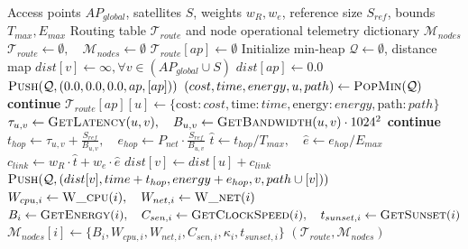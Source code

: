 \begin{algorithm}[hbtp]
\caption{Multi-Source Constellation Topology and Telemetry Mapping}
\label{alg:constellation_mapping}
\small
\begin{algorithmic}[1]
\Require Access points $AP_{global}$, satellites $S$, weights $w_R, w_e$, reference size $S_{ref}$, bounds $T_{max}, E_{max}$
\Ensure Routing table $\mathcal{T}_{route}$ and node operational telemetry dictionary $\mathcal{M}_{nodes}$
\State $\mathcal{T}_{route} \gets \emptyset, \quad \mathcal{M}_{nodes} \gets \emptyset$
    \State $\mathcal{T}_{route}[ap] \gets \emptyset$
    \State Initialize min-heap $\mathcal{Q} \gets \emptyset$, distance map $dist[v] \gets \infty, \forall v \in (AP_{global} \cup S)$
    \State $dist[ap] \gets 0.0$
    \State $\Call{Push}{\mathcal{Q}, (0.0, 0.0, 0.0, ap, [ap])}$ 
        \State $(cost, time, energy, u, path) \gets \Call{PopMin}{\mathcal{Q}}$
            \State \textbf{continue}
        \EndIf
            \State $\mathcal{T}_{route}[ap][u] \gets \{ \text{cost}: cost, \text{time}: time, \text{energy}: energy, \text{path}: path \}$
        \EndIf
            \State $\tau_{u,v} \gets \Call{GetLatency}{u, v}, \quad B_{u,v} \gets \Call{GetBandwidth}{u, v} \cdot 1024^2$
             
                \State \textbf{continue}
            \EndIf
            \State $t_{hop} \gets \tau_{u,v} + \frac{S_{ref}}{B_{u,v}}, \quad e_{hop} \gets P_{net} \cdot \frac{S_{ref}}{B_{u,v}}$
            \State $\hat{t} \gets t_{hop} / T_{max}, \quad \hat{e} \gets e_{hop} / E_{max}$
            \State $c_{link} \gets w_R \cdot \hat{t} + w_e \cdot \hat{e}$
                \State $dist[v] \gets dist[u] + c_{link}$
                \State $\Call{Push}{\mathcal{Q}, (dist[v], time + t_{hop}, energy + e_{hop}, v, path \cup [v])}$
            \EndIf
        \EndFor
    \EndWhile
\EndFor
{} 
    \State $W_{cpu,i} \gets \Call{W\_cpu}{i}, \quad W_{net,i} \gets \Call{W\_net}{i}$
    \State $B_i \gets \Call{GetEnergy}{i}, \quad C_{sen,i} \gets \Call{GetClockSpeed}{i}, \quad t_{sunset,i} \gets \Call{GetSunset}{i}$
    \State $\mathcal{M}_{nodes}[i] \gets \{ B_i, W_{cpu,i}, W_{net,i}, C_{sen,i}, \kappa_i, t_{sunset,i} \}$
\EndFor
\State \Return $(\mathcal{T}_{route}, \mathcal{M}_{nodes})$
\end{algorithmic}
\end{algorithm}
\FloatBarrier

